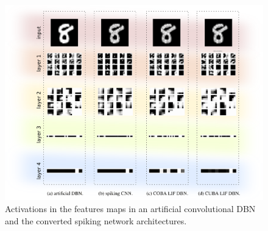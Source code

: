 \begin{figure}[h!]
	\centering
	\includegraphics[width=\textwidth]{imgs/convert/compl4.png}
	\caption{Activations in the features maps in an artificial convolutional DBN and the converted spiking network architectures. }
	\label{fig:convacts}
\end{figure}

